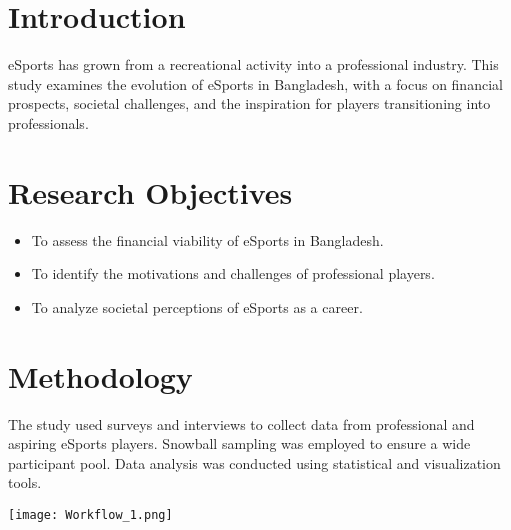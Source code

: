 \documentclass[a0,landscape]{a0poster}
\begin{document}
\begin{multicols}{4}


\section*{Introduction}
eSports has grown from a recreational activity into a professional industry. This study examines the evolution of eSports in Bangladesh, with a focus on financial prospects, societal challenges, and the inspiration for players transitioning into professionals.


\section*{Research Objectives}
\begin{itemize}
    \item To assess the financial viability of eSports in Bangladesh.
    \item To identify the motivations and challenges of professional players.
    \item To analyze societal perceptions of eSports as a career.
\end{itemize}


\section*{Methodology}
The study used surveys and interviews to collect data from professional and aspiring eSports players. Snowball sampling was employed to ensure a wide participant pool. Data analysis was conducted using statistical and visualization tools.

\texttt{[image: Workflow\_1.png]}



\end{multicols}
\end{document}

